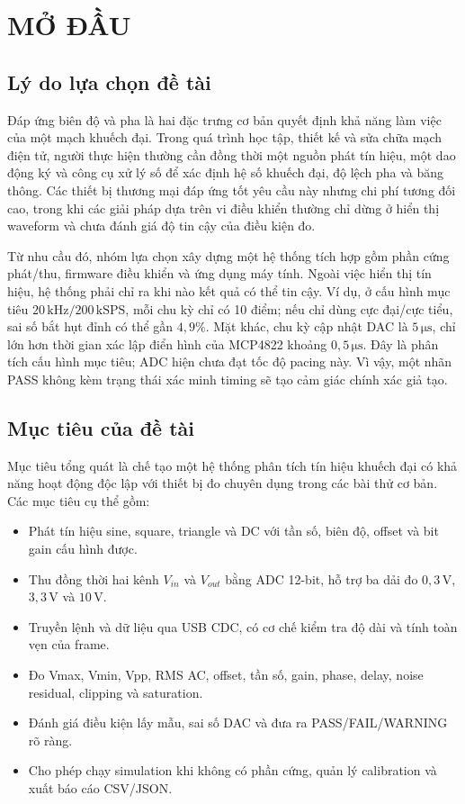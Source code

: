 \documentclass[12pt,a4paper]{report}
\newcommand{\unit}[1]{\,\mathrm{#1}}
\begin{document}
\chapter{MỞ ĐẦU}

\section{Lý do lựa chọn đề tài}
Đáp ứng biên độ và pha là hai đặc trưng cơ bản quyết định khả năng làm việc của một mạch khuếch đại. Trong quá trình học tập, thiết kế và sửa chữa mạch điện tử, người thực hiện thường cần đồng thời một nguồn phát tín hiệu, một dao động ký và công cụ xử lý số để xác định hệ số khuếch đại, độ lệch pha và băng thông. Các thiết bị thương mại đáp ứng tốt yêu cầu này nhưng chi phí tương đối cao, trong khi các giải pháp dựa trên vi điều khiển thường chỉ dừng ở hiển thị waveform và chưa đánh giá độ tin cậy của điều kiện đo.

Từ nhu cầu đó, nhóm lựa chọn xây dựng một hệ thống tích hợp gồm phần cứng phát/thu, firmware điều khiển và ứng dụng máy tính. Ngoài việc hiển thị tín hiệu, hệ thống phải chỉ ra khi nào kết quả có thể tin cậy. Ví dụ, ở cấu hình mục tiêu $20\unit{kHz}/200\unit{kSPS}$, mỗi chu kỳ chỉ có 10 điểm; nếu chỉ dùng cực đại/cực tiểu, sai số bắt hụt đỉnh có thể gần $4{,}9\%$. Mặt khác, chu kỳ cập nhật DAC là $5\unit{\mu s}$, chỉ lớn hơn thời gian xác lập điển hình của MCP4822 khoảng $0{,}5\unit{\mu s}$. Đây là phân tích cấu hình mục tiêu; ADC hiện chưa đạt tốc độ pacing này. Vì vậy, một nhãn PASS không kèm trạng thái xác minh timing sẽ tạo cảm giác chính xác giả tạo.

\section{Mục tiêu của đề tài}
Mục tiêu tổng quát là chế tạo một hệ thống phân tích tín hiệu khuếch đại có khả năng hoạt động độc lập với thiết bị đo chuyên dụng trong các bài thử cơ bản. Các mục tiêu cụ thể gồm:
\begin{itemize}
    \item Phát tín hiệu sine, square, triangle và DC với tần số, biên độ, offset và bit gain cấu hình được.
    \item Thu đồng thời hai kênh $V_{in}$ và $V_{out}$ bằng ADC 12-bit, hỗ trợ ba dải đo $0{,}3\unit{V}$, $3{,}3\unit{V}$ và $10\unit{V}$.
    \item Truyền lệnh và dữ liệu qua USB CDC, có cơ chế kiểm tra độ dài và tính toàn vẹn của frame.
    \item Đo Vmax, Vmin, Vpp, RMS AC, offset, tần số, gain, phase, delay, noise residual, clipping và saturation.
    \item Đánh giá điều kiện lấy mẫu, sai số DAC và đưa ra PASS/FAIL/WARNING rõ ràng.
    \item Cho phép chạy simulation khi không có phần cứng, quản lý calibration và xuất báo cáo CSV/JSON.
\end{itemize}
\end{document}
